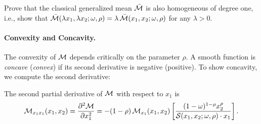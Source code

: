 \begin{callouttip}[Exercise]
Prove that the classical generalized mean $\bar{\mathcal{M}}$ is also homogeneous of degree one, i.e., show that $\bar{\mathcal{M}}(\lambda x_1, \lambda x_2; \omega, \rho) = \lambda \, \bar{\mathcal{M}}(x_1, x_2; \omega, \rho)$ for any $\lambda > 0$.
\end{callouttip}

\paragraph{Convexity and Concavity.}

The convexity of $\mathcal{M}$ depends critically on the parameter $\rho$. A smooth function is \textit{concave} (\textit{convex}) if its second derivative is negative (positive). To show concavity, we compute the second derivative:
\begin{proposition}
\label{prop:second-derivative}
The second partial derivative of $\mathcal{M}$ with respect to $x_1$ is
\begin{equation}
\label{eq:second-derivative}
\mathcal{M}_{x_1 x_1}(x_1, x_2) = \frac{\partial^2 \mathcal{M}}{\partial x_1^2} 
= -(1-\rho) \, \mathcal{M}_{x_1}(x_1, x_2) \left[ \frac{(1-\omega)^{1-\rho} x_2^\rho}{\mathcal{S}(x_1, x_2; \omega, \rho) \cdot x_1} \right].
\end{equation}
\end{proposition}

